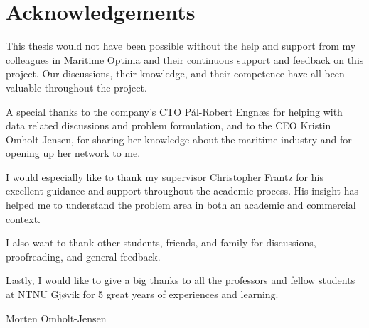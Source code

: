 \chapter*{Acknowledgements}

\begingroup

\setlength{\parskip}{1.5em}

\noindent
This thesis would not have been possible without the help and support from my colleagues in Maritime Optima and their continuous support and feedback on this project. Our discussions, their knowledge, and their competence have all been valuable throughout the project.

\noindent
A special thanks to the company's CTO Pål-Robert Engnæs for helping with data related discussions and problem formulation, and to the CEO Kristin Omholt-Jensen, for sharing her knowledge about the maritime industry and for opening up her network to me.

\noindent
I would especially like to thank my supervisor Christopher Frantz for his excellent guidance and support throughout the academic process. His insight has helped me to understand the problem area in both an academic and commercial context.

\noindent
I also want to thank other students, friends, and family for discussions, proofreading, and general feedback.

\noindent
Lastly, I would like to give a big thanks to all the professors and fellow students at NTNU Gjøvik for 5 great years of experiences and learning.

\null\hfill Morten Omholt-Jensen

\endgroup

